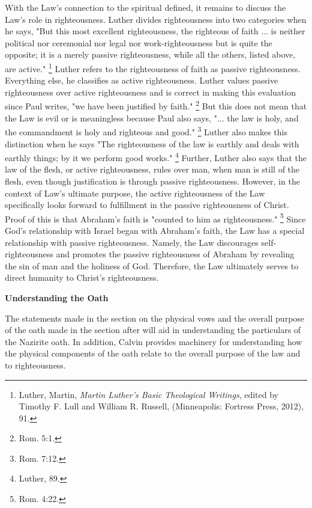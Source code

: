 \documentclass[12pt]{turabian-researchpaper}
\begin{document}
\par
With the Law's connection to the spiritual defined, it remains to discuss the Law's role in righteousness. 
Luther divides righteousness into two categories when he says, "But this most excellent righteousness, the righteous of faith ... is neither political nor ceremonial nor legal nor work-righteousness but is quite the opposite; it is a merely passive righteousness, while all the others, listed above, are active." \footnote{Luther, Martin, \textit{Martin Luther's Basic Theological Writings}, edited by Timothy F. Lull and William R. Russell, (Minneapolis: Fortress Press, 2012), 91.} 
Luther refers to the righteousness of faith as passive righteousness. 
Everything else, he classifies as active righteousness. 
Luther values passive righteousness over active righteousness and is correct in making this evaluation since Paul writes, "we have been justified by faith." \footnote{Rom. 5:1.} 
But this does not mean that the Law is evil or is meaningless because Paul also says, "... the law is holy, and the commandment is holy and righteous and good." \footnote{Rom. 7:12.}  
Luther also makes this distinction when he says "The righteousness of the law is earthly and deals with earthly things; by it we perform good works." \footnote{Luther, 89.}
Further, Luther also says that the law of the flesh, or active righteousness, rules over man, when man is still of the flesh, even though justification is through passive righteousness.
However, in the context of Law's ultimate purpose, the active righteousness of the Law specifically looks forward to fulfillment in the passive righteousness of Christ.
Proof of this is that Abraham's faith is "counted to him as righteousness." \footnote{Rom. 4:22.}
Since God's relationship with Israel began with Abraham's faith, the Law has a special relationship with passive righteousness.
Namely, the Law discourages self-righteousness and promotes the passive righteousness of Abraham by revealing the sin of man and the holiness of God.
Therefore, the Law ultimately serves to direct humanity to Christ's righteousness.

\begin{center}
\textbf{Understanding the Oath}
\end{center}
\par

The statements made in the section on the physical vows and the overall purpose of the oath made in the section after will aid in understanding the  particulars of the Nazirite oath. 
In addition, Calvin provides machinery for understanding how the physical components of the oath relate to the overall purpose of the law and to righteousness.
\end{document}
